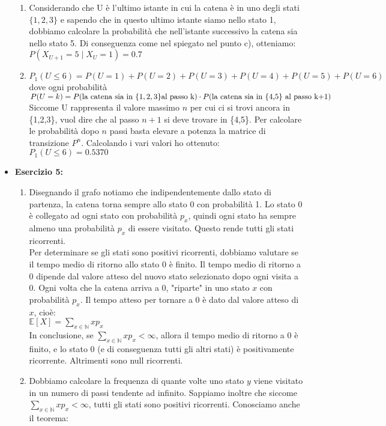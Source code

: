 \documentclass[a4paper,12pt]{article}
\begin{document}
\begin{itemize}
\begin{enumerate}[label=\alph*)]
			\item Considerando che U è l'ultimo istante in cui la catena è in uno degli stati $\{1, 2, 3\}$ e sapendo che in questo ultimo istante siamo nello stato 1, dobbiamo calcolare la probabilità che nell'istante successivo la catena sia nello stato 5. Di conseguenza come nel spiegato nel punto c), otteniamo:\\
			$P(X_{U+1} = 5 \mid X_U = 1) = 0.7$
			\item $P_1(	U \leq 6)=P(U=1)+P(U=2)+P(U=3)+P(U=4)+P(U=5)+P(U=6)$ dove ogni probabilità $P(U=k)=P(\text{la catena sia in }\{1,2,3\} \text{al passo k} ) \cdot \\P(\text{la catena sia in \{4,5\} al passo k+1})$\\
			Siccome U rappresenta il valore massimo $n$ per cui ci si trovi ancora in \{1,2,3\}, vuol dire che al passo $n+1$ si deve trovare in \{4,5\}. Per calcolare le probabilità dopo $n$ passi basta elevare a potenza la matrice di transizione $P^{n}$. Calcolando i vari valori ho ottenuto:\\
			$P_1(U \leq 6)= 0.5370$
		\end{enumerate}
		\newpage
		\item \textbf{Esercizio 5: }
		\begin{enumerate}[label=\alph*)]
			\item Disegnando il grafo notiamo che indipendentemente dallo stato di partenza, la catena torna sempre allo stato 0 con probabilità 1. Lo stato 0 è collegato ad ogni stato con probabilità $p_x$, quindi ogni stato ha sempre almeno una probabilità $p_x$ di essere visitato. Questo rende tutti gli stati ricorrenti.\\
			Per determinare se gli stati sono positivi ricorrenti, dobbiamo valutare se il tempo medio di ritorno allo stato 0 è finito. Il tempo medio di ritorno a 
			0 dipende dal valore atteso del nuovo stato selezionato dopo ogni visita a 0. Ogni volta che la catena arriva a 0, "riparte" in uno stato $x$ con probabilità $p_x$. Il tempo atteso per tornare a 0 è dato dal valore atteso di $x$, cioè:\\
			$\mathbb{E}[X] = \sum_{x \in \mathbb{N}} x p_x
			$\\
			In conclusione, se \( \sum_{x \in \mathbb{N}} x p_x < \infty \), allora il tempo medio di ritorno a \(0\) è finito, e lo stato \(0\) (e di conseguenza tutti gli altri stati) è positivamente ricorrente. Altrimenti sono null ricorrenti.
			\item Dobbiamo calcolare la frequenza di quante volte uno stato $y$ viene visitato in un numero di passi tendente ad infinito. Sappiamo inoltre che siccome \( \sum_{x \in \mathbb{N}} x p_x < \infty \), tutti gli stati sono positivi ricorrenti. Conosciamo anche il teorema:\\

\end{enumerate}
\end{itemize}
\end{document}
